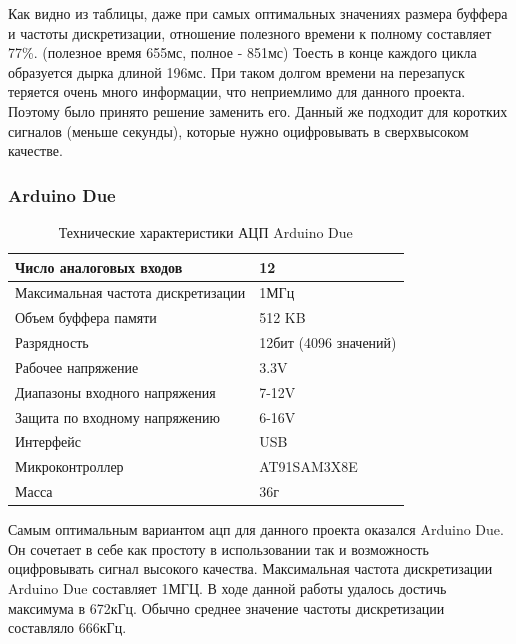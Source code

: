 \documentclass[../paper.tex]{subfiles}
\begin{document}
Как видно из таблицы, даже при самых оптимальных значениях размера буффера и частоты дискретизации, отношение полезного времени к полному составляет 77\%. (полезное время 655мс, полное -  851мс) Тоесть в конце каждого цикла образуется дырка длиной 196мс. При таком долгом времени на перезапуск теряется очень много информации, что неприемлимо для данного проекта. Поэтому было принято решение заменить его. Данный же подходит для коротких сигналов (меньше секунды), которые нужно оцифровывать в сверхвысоком качестве.

\subsubsection{Arduino Due}
\begin{table}[H]
\centering
\label{my-label}
\begin{tabular}{|l|l|}
                                                                      \hline
Число аналоговых входов            & 12                            \\ \hline
Максимальная частота дискретизации & 1МГц                          \\ \hline
Объем буффера памяти               & 512 KB					       \\ \hline
Разрядность                        & 12бит (4096 значений)         \\ \hline
Рабочее напряжение                 & 3.3V                          \\ \hline
Диапазоны входного напряжения      & 7-12V                         \\ \hline
Защита по входному напряжению      & 6-16V                         \\ \hline
Интерфейс                          & USB                           \\ \hline
Микроконтроллер                    & AT91SAM3X8E                   \\ \hline
Масса                              & 36г                           \\ \hline
\end{tabular}
\caption{Технические характеристики АЦП Arduino Due}
\end{table}

Самым оптимальным вариантом ацп для данного проекта оказался Arduino Due. Он сочетает в себе как простоту в использовании так и возможность оцифровывать сигнал высокого качества. Максимальная частота дискретизации  Arduino Due составляет 1МГЦ. В ходе данной работы удалось достичь максимума в 672кГц. Обычно среднее значение частоты дискретизации составляло 666кГц.
\end{document}

